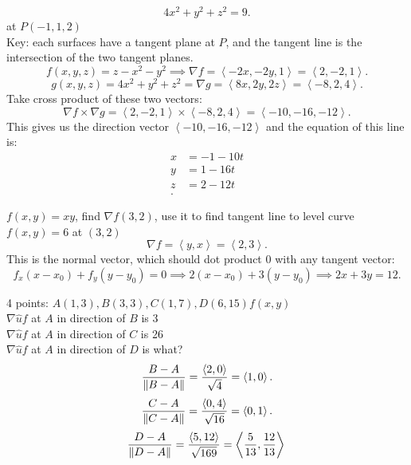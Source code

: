\begin{itemize}
\begin{example}
			\[
			4x^2 + y^2 + z^2 = 9
			.\] 
			at $P\left( -1,1,2 \right) $ \\
			Key: each surfaces have a tangent plane at $P$, and the tangent line is the intersection of the two tangent planes.\\
			\[
			f\left( x,y,z \right) = z - x^2 - y^2 \implies\nabla f = \left< -2x, -2y, 1 \right> = \left<2,-2,1 \right>
			.\]\[
			g\left( x,y,z \right)  = 4x^2 + y^2 + z^2 = \nabla g = \left< 8x, 2y, 2z \right> = \left<-8,2,4 \right>
			.\]
			Take cross product of these two vectors:
			\[
			\nabla f \times \nabla g = \left<2,-2,1 \right> \times  \left<-8,2,4 \right> = \left< -10, -16, -12 \right>
			.\] 
			This gives us the direction vector $\left<-10, -16, -12 \right>$ and the equation of this line is:
			\begin{align*}
				x &=  -1-10t \\
				y &=  1-16t \\
				z &=  2-12t \\
			.\end{align*}
		\end{example}
		\begin{example}
			$f\left( x,y \right)  = xy$, find $\nabla f (3,2)$, use it to find tangent line to level curve $f\left( x,y \right)  = 6$ at $(3,2)$ \\
			\[
			\nabla f = \left< y, x \right> = \left< 2, 3 \right>
			.\] This is the normal vector, which should dot product 0 with any tangent vector:
\[
f_x\left( x-x_0 \right) + f_y\left( y-y_0 \right)  = 0 \implies 2\left( x-x_0 \right)  + 3\left( y-y_0 \right) \implies 2x+3y = 12
.\] 
		\end{example}
		\begin{example}
			4 points: $A(1,3), B(3,3), C(1,7), D(6,15) f(x,y)$\\
			 $\nabla \hat{u}f$ at $A$ in direction of  $B$ is 3\\
			 $\nabla \hat{u}f$ at $A$ in direction of  $C$ is 26\\
			 $\nabla \hat{u}f$ at $A$ in direction of  $D$ is what?\\
			 \[
			 \frac{B - A}{\lVert B - A \rVert } = \frac{\left< 2,0 \right>}{\sqrt{4} } = \left< 1,0 \right> \\
			 .\] 
			 \[
			 \frac{C - A}{\lVert C - A \rVert } = \frac{\left< 0,4 \right>}{\sqrt{16} } = \left< 0,1 \right> \\
			 .\] 
			 \[
			  \frac{D - A}{\lVert D - A \rVert } = \frac{\left< 5,12 \right>}{\sqrt{169} } = \left< \frac{5}{13}, \frac{12}{13} \right> \\
\]
\end{example}
\end{itemize}
